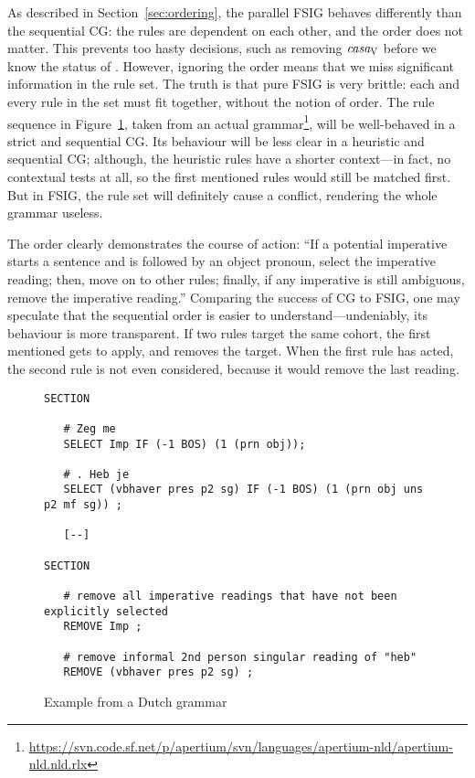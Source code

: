 As described in Section~\ref{sec:ordering}, the parallel FSIG behaves differently than the 
sequential CG: the rules are dependent on each other, and the order does not matter.
This prevents too hasty decisions, such as removing $\text{\em casa}_{\text{\sc V}}$ before we know the status of \la{}. 
However, ignoring the order means that we miss significant information in the rule set. 
The truth is that pure FSIG is very brittle: each and every rule in the set must fit together, without the notion of order. The rule sequence in Figure~\ref{fig:ruleOrder}, taken from an actual grammar\footnote{\url{https://svn.code.sf.net/p/apertium/svn/languages/apertium-nld/apertium-nld.nld.rlx}}, will be well-behaved in a strict and sequential CG. Its behaviour will be less clear in a heuristic and sequential CG; although, the heuristic rules have a shorter context---in fact, no contextual tests at all, so the first mentioned rules would still be matched first. But in FSIG, the rule set will definitely cause a conflict, rendering the whole grammar useless.



The order clearly demonstrates the course of action: ``If a potential imperative starts a sentence and is followed by an object pronoun, select the imperative reading; then, move on to other rules; finally, if any imperative is still ambiguous, remove the imperative reading.'' 
Comparing the success of CG to FSIG, one may speculate that the sequential order is easier to understand---undeniably, its behaviour is more transparent. %
If two rules target the same cohort, the first mentioned gets to apply, and removes the target. When the first rule has acted, the second rule is not even considered, because it would remove the last reading.




\begin{figure}[ht]
\centering
   \begin{verbatim}
SECTION

   # Zeg me
   SELECT Imp IF (-1 BOS) (1 (prn obj));

   # . Heb je
   SELECT (vbhaver pres p2 sg) IF (-1 BOS) (1 (prn obj uns p2 mf sg)) ;

   [--]

SECTION

   # remove all imperative readings that have not been explicitly selected
   REMOVE Imp ;

   # remove informal 2nd person singular reading of "heb"
   REMOVE (vbhaver pres p2 sg) ;

   \end{verbatim}
\label{fig:ruleOrder}
\caption{Example from a Dutch grammar}
\end{figure}


